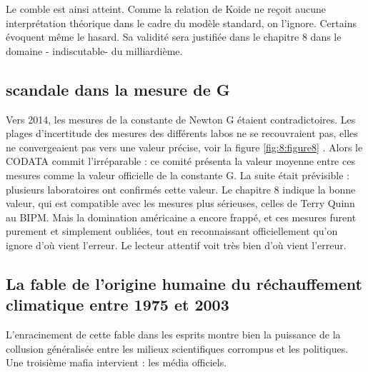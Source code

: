 \documentclass[a4paper,12pt]{article}
\begin{document}
Le comble est ainsi atteint. Comme la relation de Koide ne reçoit aucune interprétation théorique dans le cadre du modèle standard, on l’ignore. Certains évoquent même le hasard. Sa validité sera justifiée dans le chapitre 8 dans le domaine - indiscutable- du milliardième. 



\subsection {scandale dans la mesure de G}
Vers 2014, les mesures de la constante de Newton G étaient contradictoires. Les plages d’incertitude des mesures des différents labos ne se recouvraient pas, elles ne convergeaient pas vers une valeur précise, voir la figure \ref{fig:8:figure8} \cite{Wu}.
 Alors le CODATA commit l’irréparable : ce comité présenta la valeur moyenne entre ces mesures comme la valeur officielle de la constante G.
La suite était prévisible : plusieurs laboratoires ont confirmés cette valeur. Le chapitre 8 indique la bonne valeur, qui est compatible avec les mesures plus sérieuses, celles de Terry Quinn au BIPM. Mais la domination américaine a encore frappé, et ces mesures furent purement et simplement oubliées, tout en reconnaissant officiellement qu’on ignore d’où vient l’erreur.
Le lecteur attentif voit très bien d’où vient l’erreur. 








\subsection {La fable de l'origine humaine du réchauffement climatique entre 1975 et 2003}

L’enracinement de cette fable dans les esprits montre bien la puissance de la collusion généralisée entre les milieux scientifiques corrompus et les politiques. Une troisième mafia intervient : les média officiels.
\end{document}
